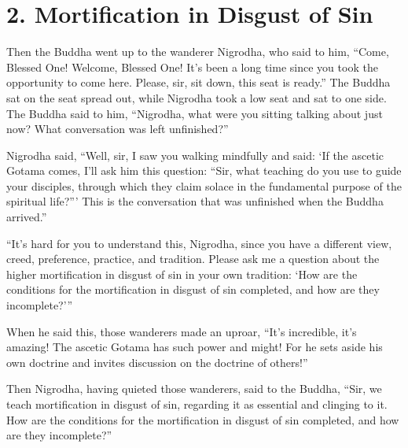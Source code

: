 \documentclass[12pt,openany]{book}%
\begin{document}
\section*{2. Mortification in Disgust of Sin }

Then the Buddha went up to the wanderer Nigrodha, who said to him, “Come, Blessed One! Welcome, Blessed One! It’s been a long time since you took the opportunity to come here. Please, sir, sit down, this seat is ready.” The Buddha sat on the seat spread out, while Nigrodha took a low seat and sat to one side. The Buddha said to him, “Nigrodha, what were you sitting talking about just now? What conversation was left unfinished?” 

Nigrodha said, “Well, sir, I saw you walking mindfully and said: ‘If the ascetic Gotama comes, I’ll ask him this question: “Sir, what teaching do you use to guide your disciples, through which they claim solace in the fundamental purpose of the spiritual life?”’ This is the conversation that was unfinished when the Buddha arrived.” 

“It’s hard for you to understand this, Nigrodha, since you have a different view, creed, preference, practice, and tradition. Please ask me a question about the higher mortification in disgust of sin in your own tradition: ‘How are the conditions for the mortification in disgust of sin completed, and how are they incomplete?’” 

When he said this, those wanderers made an uproar, “It’s incredible, it’s amazing! The ascetic Gotama has such power and might! For he sets aside his own doctrine and invites discussion on the doctrine of others!” 

Then Nigrodha, having quieted those wanderers, said to the Buddha, “Sir, we teach mortification in disgust of sin, regarding it as essential and clinging to it. How are the conditions for the mortification in disgust of sin completed, and how are they incomplete?” 
\end{document}
